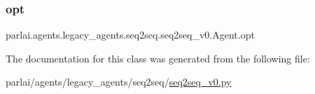 \subsubsection{\texorpdfstring{opt}{opt}}
{\footnotesize\ttfamily parlai.\+agents.\+legacy\+\_\+agents.\+seq2seq.\+seq2seq\+\_\+v0.\+Agent.\+opt}



The documentation for this class was generated from the following file\+:\begin{DoxyCompactItemize}
\item 
parlai/agents/legacy\+\_\+agents/seq2seq/\hyperlink{seq2seq__v0_8py}{seq2seq\+\_\+v0.\+py}\end{DoxyCompactItemize}
